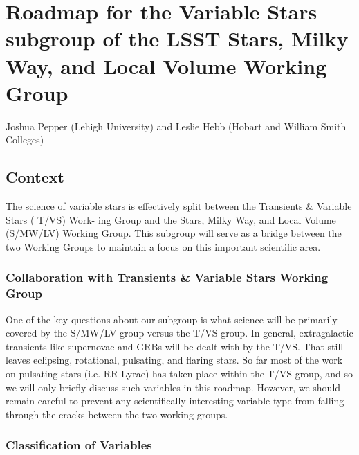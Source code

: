 \section{Roadmap for the Variable Stars subgroup of the LSST Stars, Milky Way, and Local Volume Working Group }

Joshua Pepper (Lehigh University) and Leslie Hebb (Hobart and William Smith Colleges) 

\subsection{Context }

The science of variable stars is effectively split between the Transients \& Variable Stars ( T/VS) Work- ing Group and the Stars, Milky Way, and Local Volume (S/MW/LV) Working Group. This subgroup will serve as a bridge between the two Working Groups to maintain a focus on this important scientific area. 

\subsubsection{Collaboration with Transients \& Variable Stars Working Group }

One of the key questions about our subgroup is what science will be primarily covered by the S/MW/LV group versus the T/VS group. In general, extragalactic transients like supernovae and GRBs will be dealt with by the T/VS. That still leaves eclipsing, rotational, pulsating, and flaring stars. So far most of the work on pulsating stars (i.e. RR Lyrae) has taken place within the T/VS group, and so we will only briefly discuss such variables in this roadmap. However, we should remain careful to prevent any scientifically interesting variable type from falling through the cracks between the two working groups. 

\subsubsection{Classification of Variables }

